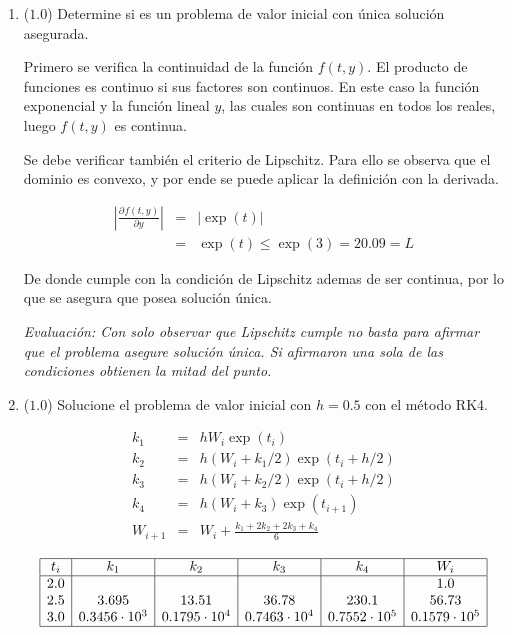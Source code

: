 \documentclass[12pt]{article}
\newcommand{\pdiff}[3]{\frac{\partial^{#3} #1}{\partial #2^{#3}}}
\newcommand{\abs}[1]{\left| #1 \right|}
\begin{document}
\begin{enumerate}[leftmargin=*,widest=9]
    \begin{enumerate}[label=\alph*]
    \item (\(1.0\)) Determine si es un problema de valor inicial con única solución asegurada.

    Primero se verifica la continuidad de la función \(f(t, y)\). El producto de funciones es continuo si sus factores son continuos. En este caso la función exponencial y la función lineal \(y\), las cuales son continuas en todos los reales, luego \(f(t, y)\) es continua.

    Se debe verificar también el criterio de Lipschitz. Para ello se observa que el dominio es convexo, y por ende se puede aplicar la definición con la derivada.

    \begin{eqnarray*}
    \abs{\pdiff{f(t,y)}{y}{}} & = & \abs{\exp(t)} \\
    & = & \exp(t) \leq \exp(3) = 20.09 = L
    \end{eqnarray*}

    De donde cumple con la condición de Lipschitz ademas de ser continua, por lo que se asegura que posea solución única.

    \textit{Evaluación: Con solo observar que Lipschitz cumple no basta para afirmar que el problema asegure solución única. Si afirmaron una sola de las condiciones obtienen la mitad del punto.}



    \item (\(1.0\)) Solucione el problema de valor inicial con \(h=0.5\) con el método RK4.



   \begin{eqnarray*}
   k_1 & = & h W_i \exp(t_i) \\
   k_2 & = & h (W_i + k_1/2) \exp(t_i + h/2)\\
   k_3 & = & h (W_i + k_2/2) \exp(t_i + h/2)\\
   k_4 & = & h (W_i + k_3) \exp(t_{i+1})\\
   W_{i+1} & = & W_i + \frac{k_1+2k_2+2k_3+k_4}{6}
   \end{eqnarray*}

   \[
   \begin{array}{|c|c|c|c|c|c|}
   \hline
   t_i & k_1 & k_2 & k_3 & k_4 & W_i\\
   \hline
   2.0 & &&&& 1.0 \\
   2.5 & 3.695 & 13.51 & 36.78 & 230.1 & 56.73\\
   3.0 & 0.3456 \cdot 10^3 & 0.1795 \cdot 10^4 & 0.7463 \cdot 10^4 & 0.7552 \cdot 10^5 & 0.1579 \cdot 10^5 \\
   \hline
   \end{array}
   \]


\end{enumerate}
\end{enumerate}
\end{document}
